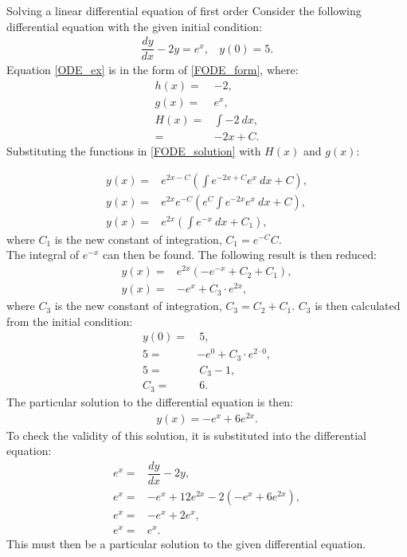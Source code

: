 \begin{example}{Solving a linear differential equation of first order}{}
Consider the following differential equation with the given initial condition:
\begin{align}
	\dfrac{dy}{dx}-2y = e^x, \label{ODE_ex} ~~~~y(0) = 5.
\end{align}
Equation \eqref{ODE_ex} is in the form of \eqref{FODE_form}, where:
\begin{align*}
	h(x) =& -2, \\
	g(x) =& e^x, \\
	H(x) =& \int{-2 \ dx}, \\
	     =& -2x + C.
\end{align*}
Substituting the functions in \eqref{FODE_solution} with $H(x)$ and $g(x)$: 

\begin{align*}
	y(x)=&e^{2x-C}\left(\int{e^{-2x+C}e^x\ dx}+C\right), \\
	y(x)=&e^{2x}e^{-C}\left(e^{C}\int{e^{-2x}e^{x}\ dx}+C\right), \\
	y(x)=&e^{2x}\left(\int{e^{-x}\ dx}+C_{1}\right),
\end{align*}
where $C_{1}$ is the new constant of integration, $C_1=e^{-C}C$. \\
The integral of $e^{-x}$ can then be found. The following result is then reduced:
\begin{align*}
	y(x)=&e^{2x}\left(-e^{-x}+C_{2}+C_{1}\right), \\
	y(x)=&-e^x+C_{3} \cdot e^{2x},
\end{align*}
where $C_{3}$ is the new constant of integration, $C_{3}=C_{2}+C_{1}$. $C_{3}$ is then calculated from the initial condition:
\begin{align*}
	y(0)=& ~ 5, \\
	5=&-e^0+C_{3} \cdot e^{2 \cdot 0}, \\
	5 =& ~ C_{3}-1, \\
	C_{3} =& ~ 6.
\end{align*}
The particular solution to the differential equation is then:
\begin{align*}
	y(x) = -e^x+6e^{2x}.
\end{align*}
To check the validity of this solution, it is substituted into the differential equation:
\begin{align*}
	e^x =& \dfrac{dy}{dx} -2y, \\
	e^x =& -e^x+12e^{2x} -2\left(-e^x+6e^{2x}\right),  \\
	e^x =& -e^x+2e^x,  \\
	e^x =& e^x.
\end{align*}
This must then be a particular solution to the given differential equation.
\end{example}

